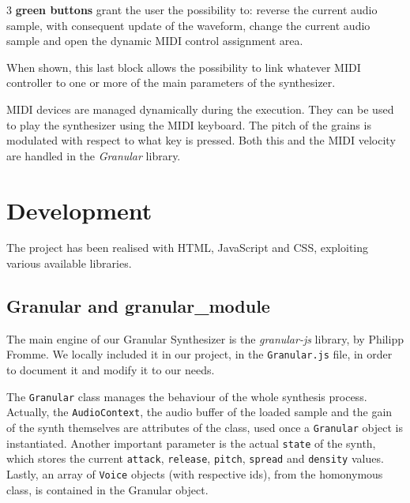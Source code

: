 \documentclass[12pt, a4paper]{article}
\begin{document}
3 \textbf{green buttons} grant the user the possibility to: reverse the current audio sample, with consequent update of the waveform, change the current audio sample and open the dynamic MIDI control assignment area. 

When shown, this last block allows the possibility to link whatever MIDI controller to one or more of the main parameters of the synthesizer.

MIDI devices are managed dynamically during the execution. They can be used to play the synthesizer using the MIDI keyboard. The pitch of the grains is modulated with respect to what key is pressed. Both this and the MIDI velocity are handled in the \emph{Granular} library.

\section{Development}
The project has been realised with HTML, JavaScript and CSS, exploiting various available libraries.

\subsection{Granular and granular\_module}
The main engine of our Granular Synthesizer is the \emph{granular-js} library, by Philipp Fromme. We locally included it in our project, in the \texttt{Granular.js} file, in order to document it and modify it to our needs. 

The \texttt{Granular} class manages the behaviour of the whole synthesis process. Actually, the \texttt{AudioContext}, the audio buffer of the loaded sample and the gain of the synth themselves are attributes of the class, used once a \texttt{Granular} object is instantiated. Another important parameter is the actual \texttt{state} of the synth, which stores the current \texttt{attack}, \texttt{release}, \texttt{pitch}, \texttt{spread} and \texttt{density} values. Lastly, an array of \texttt{Voice} objects (with respective ids), from the homonymous class, is contained in the Granular object.
\end{document}
